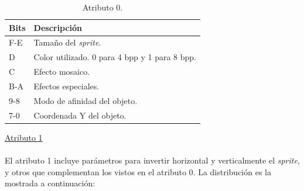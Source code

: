 \begin{table}[h]
	\centering
	\begin{tabular}{| l | l |}
		\hline
		\textbf{Bits} & \textbf{Descripción} \\ \hline
		F-E & Tamaño del \textit{sprite}. \\ \hline
		D & Color utilizado. 0 para 4 bpp y 1 para 8 bpp. \\ \hline
		C & Efecto mosaico. \\ \hline
		B-A & Efectos especiales. \\ \hline
		9-8 & Modo de afinidad del objeto. \\ \hline
		7-0 & Coordenada Y del objeto. \\ \hline
	\end{tabular}
	\caption{Atributo 0.}
	\label{tab:sprite_attr0}
\end{table}
\FloatBarrier{}

\underline{Atributo 1} \\ \\
El atributo 1 incluye parámetros para invertir horizontal y verticalmente el \textit{sprite}, y otros que complementan los vistos en el atributo 0. La distribución es la mostrada a continuación:

